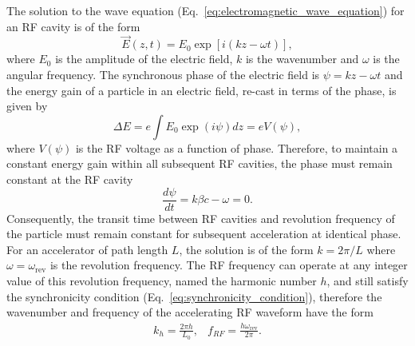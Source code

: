 \documentclass[../main.tex]{subfiles}
\begin{document}
The solution to the wave equation (Eq.~\ref{eq:electromagnetic_wave_equation}) for an RF cavity is of the form
\begin{equation}
\overrightarrow{E}\left(z,t\right) = E_{0}\exp\left[i\left(kz-\omega t\right)\right],
\label{eq:RF_cavity_electric_field}    
\end{equation}
where $E_{0}$ is the amplitude of the electric field, $k$ is the wavenumber and $\omega$ is the angular frequency. The synchronous phase of the electric field is $\psi = kz-\omega t$ and the energy gain of a particle in an electric field, re-cast in terms of the phase, is given by 
\begin{equation}
\Delta E = e \int E_{0}\exp\left(i\psi\right)dz = eV\left(\psi\right),
\label{eq:particle_energy_gain_RF}    
\end{equation}
where $V\left(\psi\right)$ is the RF voltage as a function of phase. Therefore, to maintain a constant energy gain within all subsequent RF cavities, the phase must remain constant at the RF cavity
\begin{equation}
\frac{d\psi}{dt} = k\beta c-\omega = 0. 
\label{eq:synchronicity_condition}   
\end{equation}
Consequently, the transit time between RF cavities and revolution frequency of the particle must remain constant for subsequent acceleration at identical phase. For an accelerator of path length $L$, the solution is of the form $k=2\pi/L$ where $\omega=\omega_{\mathrm{rev}}$ is the revolution frequency. The RF frequency can operate at any integer value of this revolution frequency, named the harmonic number $h$, and still satisfy the synchronicity condition (Eq.~\ref{eq:synchronicity_condition}), therefore the wavenumber and frequency of the accelerating RF waveform have the form
\begin{align}
k_{h} = \frac{2\pi h}{L_{0}}, &
f_{RF} = \frac{h\omega_{\mathrm{rev}}}{2\pi}.
\label{eq:RF_wavenumber_frequency}
\end{align}
\end{document}
